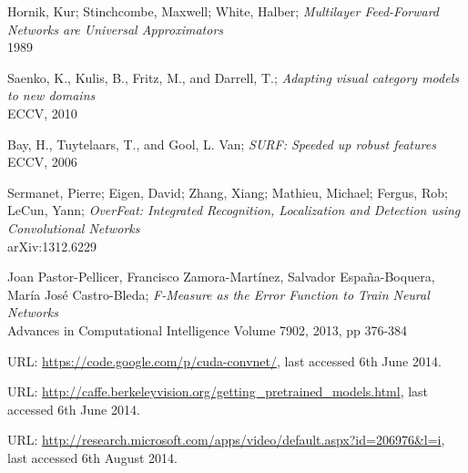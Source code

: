 \documentclass[a4paper,11pt]{article}
\begin{document}
\begin{thebibliography}{1}
 Hornik, Kur; Stinchcombe, Maxwell; White, Halber;
 \emph{Multilayer Feed-Forward Networks are Universal Approximators}\\
 1989

 Saenko, K., Kulis, B., Fritz, M., and Darrell, T.;
 \emph{Adapting visual category models to new domains}\\
 ECCV, 2010

 Bay, H., Tuytelaars, T., and Gool, L. Van;
 \emph{SURF: Speeded up robust features}\\
 ECCV, 2006

 Sermanet, Pierre; Eigen, David; Zhang, Xiang; Mathieu, Michael; Fergus, Rob; LeCun, Yann;
 \emph{OverFeat: Integrated Recognition, Localization and Detection using Convolutional Networks}\\
 arXiv:1312.6229
  
 Joan Pastor-Pellicer, Francisco Zamora-Martínez, Salvador España-Boquera, María José Castro-Bleda;
 \emph{F-Measure as the Error Function to Train Neural Networks}\\
 Advances in Computational Intelligence
 Volume 7902, 2013, pp 376-384
 
 URL: \url{https://code.google.com/p/cuda-convnet/}, last accessed 6th June 2014.

 URL: \url{http://caffe.berkeleyvision.org/getting_pretrained_models.html}, last accessed 6th June 2014.

 URL: \url{http://research.microsoft.com/apps/video/default.aspx?id=206976&l=i}, last accessed 6th August 2014.


\end{thebibliography}
\end{document}
